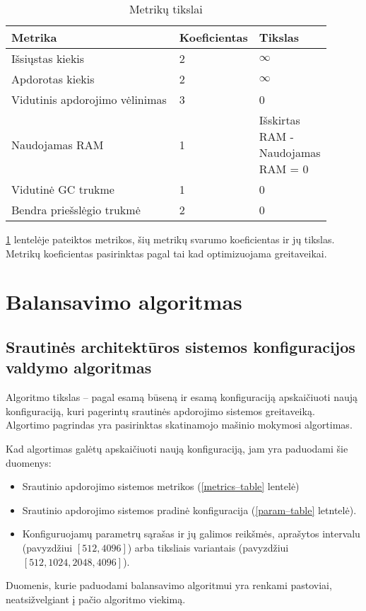 \documentclass{VUMIFPSbakalaurinis}
\begin{document}
\begin{longtable}{|p{0.55\linewidth}|p{0.15\linewidth}|p{0.2\linewidth}|}
    \caption{Metrikų tikslai}
    \label{goal-table}\\
    \hline
    \rowcolor[HTML]{C0C0C0} 
    Metrika                         & Koeficientas & Tikslas          \\ \hline
    \endfirsthead
    \endhead
    Išsiųstas kiekis                & 2 & \(\infty\)  \\ \hline
    Apdorotas kiekis                & 2 & \(\infty\) \\ \hline
    Vidutinis apdorojimo vėlinimas  & 3 & 0    \\ \hline
    Naudojamas RAM                  & 1 & Išskirtas RAM - Naudojamas RAM = 0      \\ \hline
    Vidutinė GC trukme              & 1 & 0    \\ \hline
    Bendra priešslėgio trukmė       & 2 & 0    \\ \hline
\end{longtable}

\ref{goal-table} lentelėje pateiktos metrikos, šių metrikų svarumo koeficientas ir jų tikslas. Metrikų koeficientas pasirinktas pagal tai kad optimizuojama greitaveikai. 

\section{Balansavimo algoritmas}

\subsection{Srautinės architektūros sistemos konfiguracijos valdymo algoritmas}

Algoritmo tikslas – pagal esamą būseną ir esamą konfiguraciją apskaičiuoti naują konfiguraciją, kuri pagerintų srautinės apdorojimo sistemos greitaveiką. Algortimo pagrindas yra pasirinktas skatinamojo mašinio mokymosi algortimas.

Kad algortimas galėtų apskaičiuoti naują konfiguraciją, jam yra paduodami šie duomenys:
\begin{itemize}
    \item Srautinio apdorojimo sistemos metrikos (\ref{metrics–table} lentelė)
    \item Srautinio apdorojimo sistemos pradinė konfiguracija (\ref{param–table} letntelė).
    \item Konfiguruojamų parametrų sąrašas ir jų galimos reikšmės, aprašytos intervalu (pavyzdžiui \([512,4096]\)) arba tiksliais variantais (pavyzdžiui \([512, 1024, 2048, 4096]\)).
\end{itemize}
Duomenis, kurie paduodami balansavimo algoritmui yra renkami pastoviai, neatsižvelgiant į pačio algoritmo viekimą.
\end{document}
